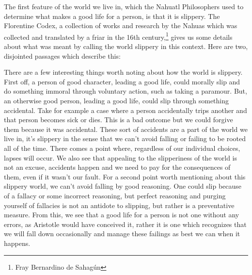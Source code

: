 The first feature of the world we live in, which the Nahuatl Philosophers used to determine what makes a good life for a person, is that it is slippery. The Florentine Codex, a collection of works and research by the Nahuas which was collected and translated by a friar in the 16th century,\footnote{Fray Bernardino de Sahag\'un} gives us some details about what was meant by calling the world slippery in this context. Here are two, disjointed passages which describe this:

There are a few interesting things worth noting about how the world is slippery. First off, a person of good character, leading a good life, could morally slip and do something immoral through voluntary action, such as taking a paramour. But, an otherwise good person, leading a good life, could slip through something accidental. Take for example a case where a person accidentally trips another and that person becomes sick or dies. This is a bad outcome but we could forgive them because it was accidental. These sort of accidents are a part of the world we live in, it's slippery in the sense that we can't avoid falling or failing to be rooted all of the time. There comes a point where, regardless of our individual choices, lapses will occur. We also see that appealing to the slipperiness of the world is not an excuse, accidents happen and we need to pay for the consequences of them, even if it wasn't our fault. For a second point worth mentioning about this slippery world, we can't avoid falling by good reasoning. One could slip because of a fallacy or some incorrect reasoning, but perfect reasoning and purging yourself of fallacies is not an antidote to slipping, but rather is a preventative measure. From this, we see that a good life for a person is not one without any errors, as Aristotle would have conceived it, rather it is one which recognizes that we will fall down occasionally and manage these failings as best we can when it happens.  

